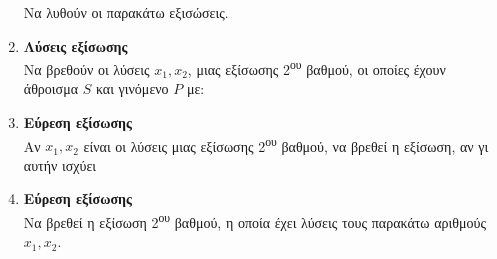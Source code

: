 \documentclass[twoside,nofonts,internet]{askhseis}
\newcommand{\tss}[1]{\textsuperscript{#1}}
\begin{document}
\begin{enumerate}
Να λυθούν οι παρακάτω εξισώσεις.
\item \textbf{Λύσεις εξίσωσης}\\
Να βρεθούν οι λύσεις $ x_1, x_2 $, μιας εξίσωσης 2\textsuperscript{ου} βαθμού, οι οποίες έχουν άθροισμα $ S $ και γινόμενο $ P $ με:
\begin{multicols}{2}
\end{multicols}
\item \textbf{Εύρεση εξίσωσης}\\
Αν $ x_1, x_2 $ είναι οι λύσεις μιας εξίσωσης 2\tss{ου} βαθμού, να βρεθεί η εξίσωση, αν γι αυτήν ισχύει
\item \textbf{Εύρεση εξίσωσης}\\
Να βρεθεί η εξίσωση 2\tss{ου} βαθμού, η οποία έχει λύσεις τους παρακάτω αριθμούς $ x_1,x_2 $.
\end{enumerate}
\end{document}
